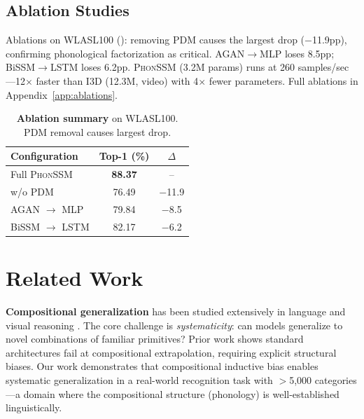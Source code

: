 \documentclass{article}
\theoremstyle{definition}
\theoremstyle{remark}
\newcommand{\phonssm}{\textsc{PhonSSM}}
\begin{document}
\subsection{Ablation Studies}

Ablations on WLASL100 (): removing PDM causes the largest drop ($-$11.9pp), confirming phonological factorization as critical. AGAN$\to$MLP loses 8.5pp; BiSSM$\to$LSTM loses 6.2pp. \phonssm{} (3.2M params) runs at 260 samples/sec---12$\times$ faster than I3D (12.3M, video) with 4$\times$ fewer parameters. Full ablations in Appendix~\ref{app:ablations}.

\begin{table}[!t]
\caption{\textbf{Ablation summary} on WLASL100. PDM removal causes largest drop.}
\label{tab:analysis}
\vspace{-2mm}
\begin{center}
\begin{small}
\begin{tabular*}{\columnwidth}{@{\extracolsep{\fill}}lcc@{}}
\toprule
Configuration & Top-1 (\%) & $\Delta$ \\
\midrule
Full \phonssm{} & \textbf{88.37} & -- \\
w/o PDM & 76.49 & $-$11.9 \\
AGAN $\rightarrow$ MLP & 79.84 & $-$8.5 \\
BiSSM $\rightarrow$ LSTM & 82.17 & $-$6.2 \\
\bottomrule
\end{tabular*}
\end{small}
\end{center}
\vspace{-4mm}
\end{table}

\section{Related Work}

\textbf{Compositional generalization} has been studied extensively in language \citep{lake2018generalization, keysers2020measuring} and visual reasoning \citep{bahdanau2019systematic}. The core challenge is \textit{systematicity}: can models generalize to novel combinations of familiar primitives? Prior work shows standard architectures fail at compositional extrapolation, requiring explicit structural biases. Our work demonstrates that compositional inductive bias enables systematic generalization in a real-world recognition task with $>$5,000 categories---a domain where the compositional structure (phonology) is well-established linguistically.
\end{document}
